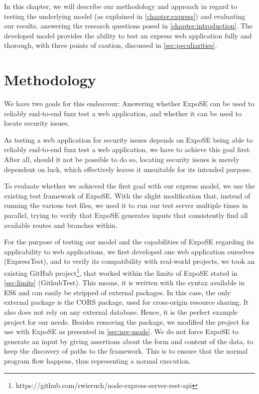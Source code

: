 \raggedbottom
In this chapter, we will describe our methodology and approach in regard to testing the underlying model (as explained in \autoref{chapter:express}) and evaluating our results, answering the research questions posed in \autoref{chapter:introduction}. 
The developed model provides the ability to test an express web application fully and thorough, with three points of caution, discussed in \autoref{sec:peculiarities}.

\section{Methodology} 
We have two goals for this endeavour: Answering whether ExpoSE can be used to reliably end-to-end fuzz test a web application, and whether it can be used to locate security issues.

As testing a web application for security issues depends on ExpoSE being able to reliably end-to-end fuzz test a web application, we have to achieve this goal first. After all, should it not be possible to do so, locating security issues is merely dependent on luck, which effectively leaves it unsuitable for its intended purpose. 

To evaluate whether we achieved the first goal with our express model, we use the existing test framework of ExpoSE. With the slight modification that, instead of running the various test files, we used it to run our test server multiple times in parallel, trying to verify that ExpoSE generates inputs that consistently find all available routes and branches within.


For the purpose of testing our model and the capabilities of ExpoSE regarding its applicability to web applications, we first developed one web application ourselves (ExpressTest), and to verify its compatibility with real-world projects, we took an existing GitHub project\footnote{https://github.com/rwieruch/node-express-server-rest-api}, that worked within the limits of ExpoSE stated in \autoref{sec:limits} (GithubTest). This means, it is written with the syntax available in ES6 and can easily be stripped of external packages. In this case, the only external package is the CORS package, used for cross-origin resource sharing. It also does not rely on any external database. Hence, it is the perfect example project for our needs. Besides removing the package, we modified the project for use with ExpoSE as presented in \autoref{sec:nec-mods}.
We do not force ExpoSE to generate an input by giving assertions about the form and content of the data, to keep the discovery of paths to the framework. This is to ensure that the normal program flow happens, thus representing a normal execution. 


